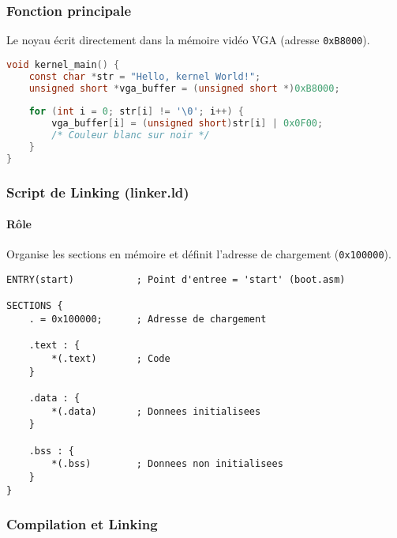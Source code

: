 \documentclass{article}
\begin{document}
\subsubsection{Fonction principale}
Le noyau écrit directement dans la mémoire vidéo VGA (adresse \texttt{0xB8000}).

\begin{lstlisting}[language=C]
void kernel_main() {
    const char *str = "Hello, kernel World!";
    unsigned short *vga_buffer = (unsigned short *)0xB8000;
    
    for (int i = 0; str[i] != '\0'; i++) {
        vga_buffer[i] = (unsigned short)str[i] | 0x0F00; 
        /* Couleur blanc sur noir */
    }
}
\end{lstlisting}

\subsubsection{Script de Linking (linker.ld)}
\paragraph{Rôle}
Organise les sections en mémoire et définit l'adresse de chargement (\texttt{0x100000}).

\begin{lstlisting}[language=ld]
ENTRY(start)           ; Point d'entree = 'start' (boot.asm)

SECTIONS {
    . = 0x100000;      ; Adresse de chargement

    .text : {
        *(.text)       ; Code
    }

    .data : {
        *(.data)       ; Donnees initialisees
    }

    .bss : {
        *(.bss)        ; Donnees non initialisees
    }
}
\end{lstlisting}

\subsubsection{Compilation et Linking}
\end{document}
